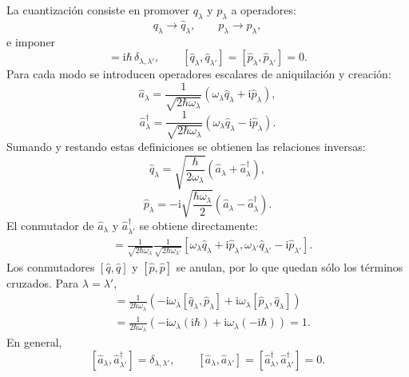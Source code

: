 \documentclass[11pt]{article}
\newcommand{\ii}{\mathrm{i}}
\begin{document}
La cuantizaci\'on consiste en promover $q_\lambda$ y $p_\lambda$ a operadores:
\begin{equation}
  q_\lambda\longrightarrow\hat q_\lambda,
  \qquad
  p_\lambda\longrightarrow\hat p_\lambda,
\end{equation}
e imponer
\begin{equation}
  [\hat q_\lambda,\hat p_{\lambda'}]
  =
  \ii\hbar\,\delta_{\lambda,\lambda'},
  \qquad
  [\hat q_\lambda,\hat q_{\lambda'}]=
  [\hat p_\lambda,\hat p_{\lambda'}]=0.
\end{equation}
Para cada modo se introducen operadores escalares de aniquilaci\'on y
creaci\'on:
\begin{equation}
  \hat a_\lambda
  =
  \frac{1}{\sqrt{2\hbar\omega_\lambda}}
  (\omega_\lambda\hat q_\lambda+\ii\hat p_\lambda),
\end{equation}
\begin{equation}
  \hat a_\lambda^\dagger
  =
  \frac{1}{\sqrt{2\hbar\omega_\lambda}}
  (\omega_\lambda\hat q_\lambda-\ii\hat p_\lambda).
\end{equation}
Sumando y restando estas definiciones se obtienen las relaciones inversas:
\begin{equation}
  \hat q_\lambda
  =
  \sqrt{\frac{\hbar}{2\omega_\lambda}}
  \left(
  \hat a_\lambda+\hat a_\lambda^\dagger
  \right),
\end{equation}
\begin{equation}
  \hat p_\lambda
  =
  -\ii\sqrt{\frac{\hbar\omega_\lambda}{2}}
  \left(
  \hat a_\lambda-\hat a_\lambda^\dagger
  \right).
\end{equation}
El conmutador de $\hat a_\lambda$ y $\hat a_{\lambda'}^\dagger$ se obtiene
directamente:
\begin{align}
  [\hat a_\lambda,\hat a_{\lambda'}^\dagger]
  &=
  \frac{1}{\sqrt{2\hbar\omega_\lambda}}
  \frac{1}{\sqrt{2\hbar\omega_{\lambda'}}}
  [\omega_\lambda\hat q_\lambda+\ii\hat p_\lambda,
  \omega_{\lambda'}\hat q_{\lambda'}-\ii\hat p_{\lambda'}].
\end{align}
Los conmutadores $[\hat q,\hat q]$ y $[\hat p,\hat p]$ se anulan, por lo que
quedan s\'olo los t\'erminos cruzados. Para $\lambda=\lambda'$,
\begin{align}
  [\hat a_\lambda,\hat a_{\lambda}^\dagger]
  &=
  \frac{1}{2\hbar\omega_\lambda}
  \left(
  -\ii\omega_\lambda[\hat q_\lambda,\hat p_\lambda]
  +
  \ii\omega_\lambda[\hat p_\lambda,\hat q_\lambda]
  \right)\\
  &=
  \frac{1}{2\hbar\omega_\lambda}
  \left(
  -\ii\omega_\lambda(\ii\hbar)
  +
  \ii\omega_\lambda(-\ii\hbar)
  \right)
  =
  1.
\end{align}
En general,
\begin{equation}
  \boxed{
  [\hat a_\lambda,\hat a_{\lambda'}^\dagger]
  =
  \delta_{\lambda,\lambda'},
  \qquad
  [\hat a_\lambda,\hat a_{\lambda'}]=
  [\hat a_\lambda^\dagger,\hat a_{\lambda'}^\dagger]=0.
  }
\end{equation}
\end{document}
